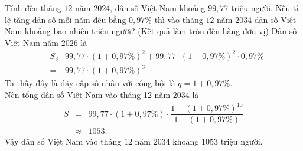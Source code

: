 \begin{bt}%
	Tính đến tháng $12$ năm $2024$, dân số Việt Nam khoảng $99{,}77$ triệu người. Nếu tỉ lệ tăng dân số mỗi năm đều bằng $0{,}97\%$ thì vào tháng $12$ năm $2034$ dân số Việt Nam khoảng bao nhiêu triệu người? (Kết quả làm tròn đến hàng đơn vị)
	Dân số Việt Nam năm $2026$ là \allowdisplaybreaks
	\begin{eqnarray*}
		&S_3&99{,}77\cdot\left(1+0{,}97\%\right)^2+99{,}77\cdot\left(1+0{,}97\%\right)^2\cdot 0{,}97\%\\
		&=&99{,}77\cdot\left(1+0{,}97\%\right)^3
	\end{eqnarray*}
	Ta thấy đây là dãy cấp số nhân với công bội là $q=1+0{,}97\%$.\\
	Nên tổng dân số Việt Nam vào tháng 12 năm $2034$ là \allowdisplaybreaks
	\begin{eqnarray*}
		S&=&99{,}77\cdot\left(1+0{,}97\%\right)\cdot\dfrac{1-\left(1+0{,}97\%\right)^{10}}{1-\left(1+0{,}97\%\right)}\\
		&\approx& 1053.
	\end{eqnarray*}
	Vậy dân số Việt Nam vào tháng $12$ năm $2034$ khoảng $1053$ triệu người.
\end{bt}

